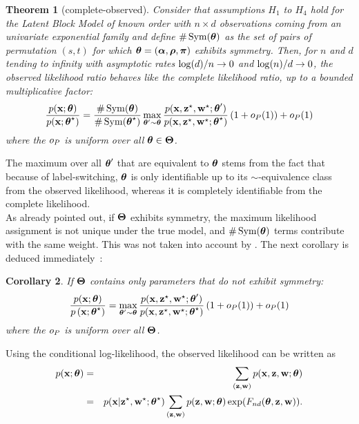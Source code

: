\documentclass[bj]{imsart}
\numberwithin{equation}{section}
\theoremstyle{plain}
\newtheorem{thm}{Theorem}[section]
\newtheorem{corollaire}[thm]{Corollary}
\theoremstyle{remark}
\begin{document}
\begin{thm}[complete-observed]
  \label{thm:observed-akin-to-complete-general}
  Consider that assumptions $H_1$ to $H_4$ hold for the Latent Block Model of known order with $n\times d$ observations coming from an univariate exponential family  and define  $\# \operatorname{Sym}(\boldsymbol{\theta})$ as the set of pairs of permutation $(s,t)$ for which $\boldsymbol{\theta}=(\boldsymbol{\alpha},\boldsymbol{\rho},\boldsymbol{\pi})$ exhibits symmetry. Then, for $n$ and $d$ tending to infinity with asymptotic rates  $\log (d)/n\rightarrow 0$ and $\log(n)/d\rightarrow 0$, the observed likelihood ratio behaves like the complete likelihood ratio, up to a bounded multiplicative factor:
  \begin{equation*}
    \frac{\prob(\bx; \btheta)}{\prob(\bx; \bthetas)} = \frac{\# \Symmetric(\btheta)}{\# \Symmetric(\bthetas)} \max_{\btheta' \sim \btheta} \frac{\prob(\bx, \bzs, \bws; \btheta')}{\prob(\bx, \bzs, \bws; \bthetas)}\left(1 + \smallO_P(1)\right) + \smallO_P(1)
  \end{equation*}
  where the $o_P$ is uniform over all $\boldsymbol{\theta} \in \boldsymbol{\Theta}$.
\end{thm}
 The maximum over all $\boldsymbol{\theta}'$ that are equivalent to $\boldsymbol{\theta}$ stems from the fact that because of label-switching, $\boldsymbol{\theta}$ is only identifiable up to its $\sim$-equivalence class from the observed likelihood, whereas it is completely identifiable from the complete likelihood.\\
As already pointed out, if $\boldsymbol{\Theta}$ exhibits symmetry, the maximum likelihood assignment is not unique under the true model, and $\# \operatorname{Sym}(\boldsymbol{\theta})$ terms contribute with the same weight. This was not taken into account by \cite{bickel2013asymptotic}.
The next corollary is deduced immediately~:
\begin{corollaire}
  \label{cor:observed-akin-to-complete-simple-case}
  If $\boldsymbol{\Theta}$ contains only parameters that do not exhibit symmetry:
  \begin{equation*}
    \frac{\prob(\bx; \btheta)}{\prob\left(\bx; \btheta^{\vrai}\right)} = \max_{\btheta' \sim \btheta} \frac{\prob(\bx, \bzs, \bws; \btheta')}{\prob(\bx, \bzs, \bws; \bthetas)}\left(1 + \smallO_P(1)\right) + \smallO_P(1)
  \end{equation*}
where the $o_P$ is uniform over all $\boldsymbol{\Theta}$.
\end{corollaire}


Using the conditional log-likelihood, the observed likelihood can be written as
\begin{eqnarray}
\nonumber
\prob(\bx; \btheta) &=&
  \sum_{ (\bz, \bw)} \prob(\bx, \bz, \bw; \btheta) \\
%
&=&\prob(\bx| \bzs, \bws; \bthetas)
 \sum_{(\bz, \bw)}   \prob(\bz, \bw; \btheta) \exp(\Fnd(\btheta, \bz, \bw) ).
\end{eqnarray} 
\end{document}
